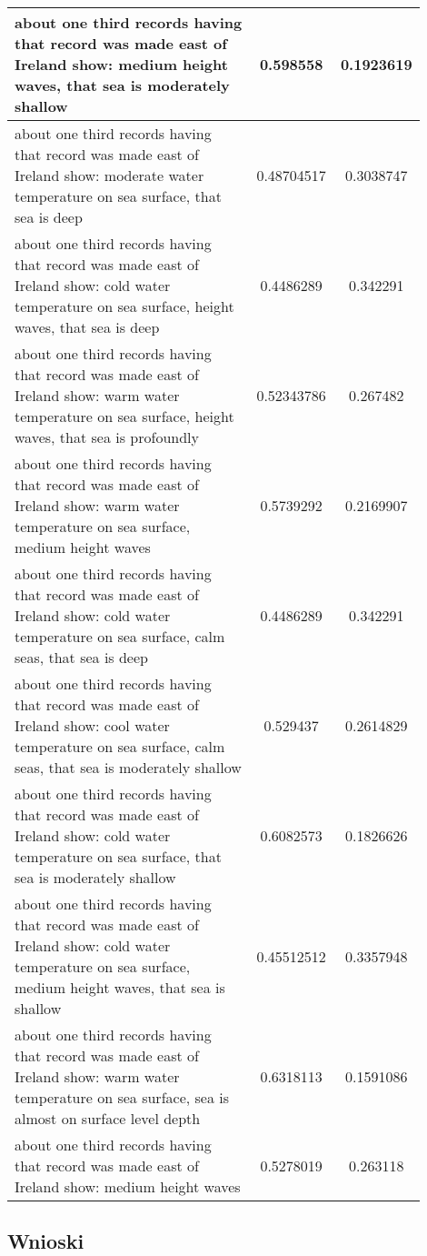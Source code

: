 \documentclass{article}
\begin{document}
\begin{longtable}{|p{0.9\linewidth}|c|c|}
about one third records having that record was made east of Ireland show: medium height waves, that sea is moderately shallow & 0.598558 & 0.1923619 \\ \hline
about one third records having that record was made east of Ireland show: moderate water temperature on sea surface, that sea is deep & 0.48704517 & 0.3038747 \\ \hline
about one third records having that record was made east of Ireland show: cold water temperature on sea surface, height waves, that sea is deep & 0.4486289 & 0.342291 \\ \hline
about one third records having that record was made east of Ireland show: warm water temperature on sea surface, height waves, that sea is profoundly & 0.52343786 & 0.267482 \\ \hline
about one third records having that record was made east of Ireland show: warm water temperature on sea surface, medium height waves & 0.5739292 & 0.2169907 \\ \hline
about one third records having that record was made east of Ireland show: cold water temperature on sea surface, calm seas, that sea is deep & 0.4486289 & 0.342291 \\ \hline
about one third records having that record was made east of Ireland show: cool water temperature on sea surface, calm seas, that sea is moderately shallow & 0.529437 & 0.2614829 \\ \hline
about one third records having that record was made east of Ireland show: cold water temperature on sea surface, that sea is moderately shallow & 0.6082573 & 0.1826626 \\ \hline
about one third records having that record was made east of Ireland show: cold water temperature on sea surface, medium height waves, that sea is shallow & 0.45512512 & 0.3357948 \\ \hline
about one third records having that record was made east of Ireland show: warm water temperature on sea surface, sea is almost on surface level depth & 0.6318113 & 0.1591086 \\ \hline
about one third records having that record was made east of Ireland show: medium height waves & 0.5278019 & 0.263118 \\ \hline

\end{longtable}

\subsection{Wnioski}
\end{document}
